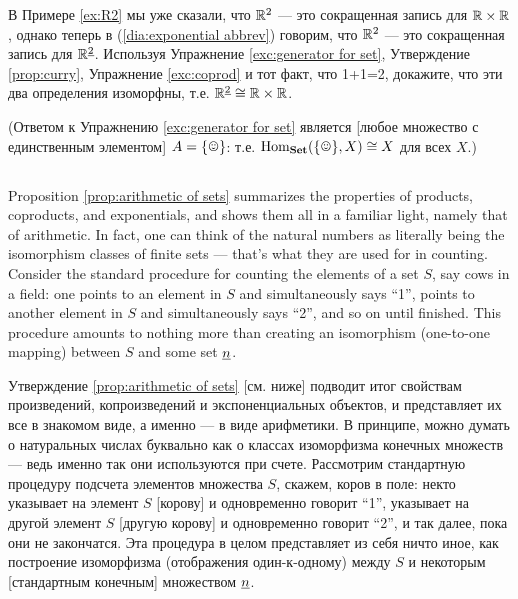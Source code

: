 \documentclass[CT4S-EN-RU]{subfiles}
\begin{document}
\begin{exerciseRUS}\label{exc:two R2s}
В Примере \ref{ex:R2} мы уже сказали, что ${\mathbb R}^2$ — это сокращенная запись для ${\mathbb R}\times{\mathbb R}$, однако теперь в (\ref{dia:exponential abbrev}) говорим, что ${\mathbb R}^2$ — это сокращенная запись для ${\mathbb R}^{\underline{2}}$. Используя Упражнение \ref{exc:generator for set}, Утверждение \ref{prop:curry}, Упражнение \ref{exc:coprod} и тот факт, что 1+1=2, докажите, что эти два определения изоморфны, т.е. ${\mathbb R}^{\underline{2}}\cong{\mathbb R}\times{\mathbb R}$.

(Ответом к Упражнению \ref{exc:generator for set} является [любое множество с единственным элементом] $A=\singleton$: т.е. $\Hom_\Set(\singleton,X)\iso X$ для всех $X$.)
\end{exerciseRUS}


\subsection{}\label{sec:arithmetic of sets}

\begin{blockENG}
Proposition \ref{prop:arithmetic of sets} summarizes the properties of products, coproducts, and exponentials, and shows them all in a familiar light, namely that of arithmetic. In fact, one can think of the natural numbers as literally being the isomorphism classes of finite sets — that's what they are used for in counting. Consider the standard procedure for counting the elements of a set $S$, say cows in a field: one points to an element in $S$ and simultaneously says “1”, points to another element in $S$ and simultaneously says “2”, and so on until finished. This procedure amounts to nothing more than creating an isomorphism (one-to-one mapping) between $S$ and some set $\underline{n}$. 
\end{blockENG}

\begin{blockRUS}
Утверждение \ref{prop:arithmetic of sets} [см. ниже] подводит итог свойствам произведений, копроизведений и экспоненциальных объектов, и представляет их все в знакомом виде, а именно — в виде арифметики. В принципе, можно думать о натуральных числах буквально как о классах изоморфизма конечных множеств — ведь именно так они используются при счете. Рассмотрим стандартную процедуру подсчета элементов множества $S$, скажем, коров в поле: некто указывает на элемент $S$ [корову] и одновременно говорит “1”, указывает на другой элемент $S$ [другую корову] и одновременно говорит “2”, и так далее, пока они не закончатся. Эта процедура в целом представляет из себя ничто иное, как построение изоморфизма (отображения один-к-одному) между $S$ и некоторым [стандартным конечным] множеством $\underline{n}$. 
\end{blockRUS}
\end{document}
